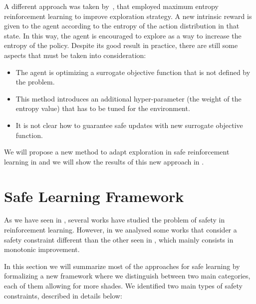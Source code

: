 A different approach was taken by~\cite{haarnoja_reinforcement_2017}, \cite{ziebart_maximum_2008} that employed maximum entropy reinforcement learning to improve exploration strategy. A new intrinsic reward is given to the agent according to the entropy of the action distribution in that state. In this way, the agent is encouraged to explore as a way to increase the entropy of the policy. Despite its good result in practice, there are still some aspects that must be taken into consideration:
\begin{itemize}
\item The agent is optimizing a surrogate objective function that is not defined by the problem.
\item This method introduces an additional hyper-parameter (the weight of the entropy value) that has to be tuned for the environment.
\item It is not clear how to guarantee safe updates with new surrogate objective function.
\end{itemize}

We will propose a new method to adapt exploration in safe reinforcement learning in  and we will show the results of this new approach in .


\section{Safe Learning Framework}\label{sec:framework}

As we have seen in , several works have studied the problem of safety in reinforcement learning. However, in  we analysed some works that consider a safety constraint different than the other seen in , which mainly consists in monotonic improvement. 

In this section we will summarize most of the approaches for safe learning by formalizing a new framework where we distinguish between two main categories, each of them allowing for more shades. We identified two main types of safety constraints, described in details below:

